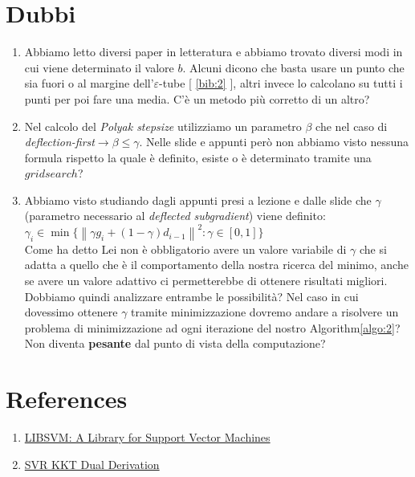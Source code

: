 \documentclass[12pt]{article}
\newcommand{\norm}[1]{\left\lVert#1\right\rVert}
\begin{document}
	\section{Dubbi}
	\begin{enumerate}
		\item Abbiamo letto diversi paper in letteratura e abbiamo trovato diversi modi in cui viene determinato il valore $b$. Alcuni dicono che basta usare un punto che sia fuori o al margine dell’$\varepsilon$-tube {[ \ref{bib:2} ]}, altri invece lo calcolano su tutti i punti per poi fare una media. C’è un metodo più corretto di un altro? 
		\item Nel calcolo del \textit{Polyak stepsize} utilizziamo un parametro $\beta$ che nel caso di \textit{deflection-first}$ \longrightarrow \beta \leq \gamma$. Nelle slide e appunti però non abbiamo visto nessuna formula rispetto la quale è definito, esiste o è determinato tramite una $grid search$?
		\item Abbiamo visto studiando dagli appunti presi a lezione e dalle slide che $\gamma$ (parametro necessario al \textit{deflected subgradient}) viene definito:\\ $ \gamma_i \in \min\{\norm{\gamma g_i + (1-\gamma)d_{i-1}}^2 : \gamma \in [0,1]\}$\\
		Come ha detto Lei non è obbligatorio avere un valore variabile di $\gamma$ che si adatta a quello che è il comportamento della nostra ricerca del minimo, anche se avere un valore adattivo ci permetterebbe di ottenere risultati migliori. Dobbiamo quindi analizzare entrambe le possibilità? Nel caso in cui dovessimo ottenere $\gamma$ tramite minimizzazione dovremo andare a risolvere un problema di minimizzazione ad ogni iterazione del nostro Algorithm\ref{algo:2}? Non diventa \textbf{pesante} dal punto di vista della computazione?
	\end{enumerate}

	\section{References}
	\begin{enumerate}
		\item \href{https://www.csie.ntu.edu.tw/~cjlin/papers/libsvm.pdf}{LIBSVM: A Library for Support Vector Machines } \label{bib:1}
		\item \href{https://www.cse.iitb.ac.in/~cs709/notes/enotes/svr-kkt-dual-derivation.pdf}{SVR KKT Dual Derivation } \label{bib:2}
	\end{enumerate}
\end{document}
